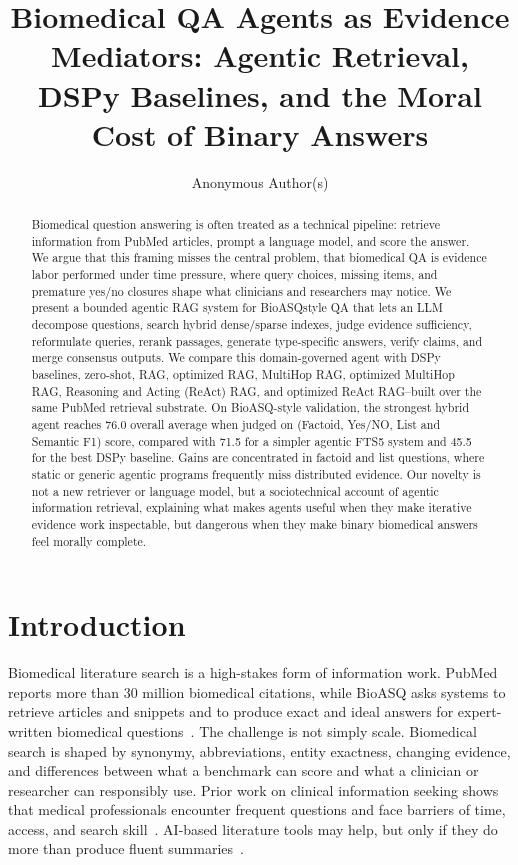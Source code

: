 \documentclass[sigconf,anonymous,review]{acmart}
\begin{document}
\title{Biomedical QA Agents as Evidence Mediators: Agentic Retrieval, DSPy Baselines, and the Moral Cost of Binary Answers}

\author{Anonymous Author(s)}

\begin{abstract}
Biomedical question answering is often treated as a technical pipeline:
retrieve information from PubMed articles, prompt a language
model, and score the answer. We argue that this framing misses the
central problem, that biomedical QA is evidence labor performed
under time pressure, where query choices, missing items, and premature yes/no closures shape what clinicians and researchers may
notice. We present a bounded agentic RAG system for BioASQstyle QA that lets an LLM decompose questions, search hybrid
dense/sparse indexes, judge evidence sufficiency, reformulate queries,
rerank passages, generate type-specific answers, verify claims, and
merge consensus outputs. We compare this domain-governed agent
with DSPy baselines, zero-shot, RAG, optimized RAG, MultiHop
RAG, optimized MultiHop RAG, Reasoning and Acting (ReAct) RAG,
and optimized ReAct RAG–built over the same PubMed retrieval
substrate. On BioASQ-style validation, the strongest hybrid agent
reaches 76.0 overall average when judged on (Factoid, Yes/NO, List
and Semantic F1) score, compared with 71.5 for a simpler agentic
FTS5 system and 45.5 for the best DSPy baseline. Gains are concentrated in factoid and list questions, where static or generic agentic
programs frequently miss distributed evidence. Our novelty is not
a new retriever or language model, but a sociotechnical account of
agentic information retrieval, explaining what makes agents useful
when they make iterative evidence work inspectable, but dangerous
when they make binary biomedical answers feel morally complete.
\end{abstract}


\maketitle

\section{Introduction}

Biomedical literature search is a high-stakes form of information
work. PubMed reports more than 30 million biomedical citations,
while BioASQ asks systems to retrieve articles and snippets and
to produce exact and ideal answers for expert-written biomedical
questions~\cite{bioasq2025,bioasq2025b}. The challenge is not simply scale. Biomedical search
is shaped by synonymy, abbreviations, entity exactness, changing
evidence, and differences between what a benchmark can score
and what a clinician or researcher can responsibly use. Prior work
on clinical information seeking shows that medical professionals
encounter frequent questions and face barriers of time, access, and
search skill~\cite{daei2020clinical}. AI-based literature tools may help, but only if they
do more than produce fluent summaries~\cite{gu2021domain}.
\end{document}
